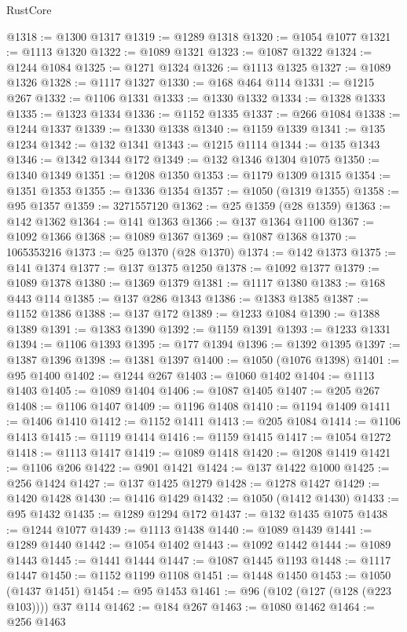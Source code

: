 \begin{lexlean}{RustCore}
\begin{coremodule}
@1318 := @1300 @1317
@1319 := @1289 @1318
@1320 := @1054 @1077
@1321 := @1113 @1320
@1322 := @1089 @1321
@1323 := @1087 @1322
@1324 := @1244 @1084
@1325 := @1271 @1324
@1326 := @1113 @1325
@1327 := @1089 @1326
@1328 := @1117 @1327
@1330 := @168 @464 @114
@1331 := @1215 @267
@1332 := @1106 @1331
@1333 := @1330 @1332
@1334 := @1328 @1333
@1335 := @1323 @1334
@1336 := @1152 @1335
@1337 := @266 @1084
@1338 := @1244 @1337
@1339 := @1330 @1338
@1340 := @1159 @1339
@1341 := @135 @1234
@1342 := @132 @1341
@1343 := @1215 @1114
@1344 := @135 @1343
@1346 := @1342 @1344 @172
@1349 := @132 @1346 @1304 @1075
@1350 := @1340 @1349
@1351 := @1208 @1350
@1353 := @1179 @1309 @1315
@1354 := @1351 @1353
@1355 := @1336 @1354
@1357 := @1050 (@1319 @1355)
@1358 := @95 @1357
@1359 := 3271557120
@1362 := @25 @1359 (@28 @1359)
@1363 := @142 @1362
@1364 := @141 @1363
@1366 := @137 @1364 @1100
@1367 := @1092 @1366
@1368 := @1089 @1367
@1369 := @1087 @1368
@1370 := 1065353216
@1373 := @25 @1370 (@28 @1370)
@1374 := @142 @1373
@1375 := @141 @1374
@1377 := @137 @1375 @1250
@1378 := @1092 @1377
@1379 := @1089 @1378
@1380 := @1369 @1379
@1381 := @1117 @1380
@1383 := @168 @443 @114
@1385 := @137 @286 @1343
@1386 := @1383 @1385
@1387 := @1152 @1386
@1388 := @137 @172
@1389 := @1233 @1084
@1390 := @1388 @1389
@1391 := @1383 @1390
@1392 := @1159 @1391
@1393 := @1233 @1331
@1394 := @1106 @1393
@1395 := @177 @1394
@1396 := @1392 @1395
@1397 := @1387 @1396
@1398 := @1381 @1397
@1400 := @1050 (@1076 @1398)
@1401 := @95 @1400
@1402 := @1244 @267
@1403 := @1060 @1402
@1404 := @1113 @1403
@1405 := @1089 @1404
@1406 := @1087 @1405
@1407 := @205 @267
@1408 := @1106 @1407
@1409 := @1196 @1408
@1410 := @1194 @1409
@1411 := @1406 @1410
@1412 := @1152 @1411
@1413 := @205 @1084
@1414 := @1106 @1413
@1415 := @1119 @1414
@1416 := @1159 @1415
@1417 := @1054 @1272
@1418 := @1113 @1417
@1419 := @1089 @1418
@1420 := @1208 @1419
@1421 := @1106 @206
@1422 := @901 @1421
@1424 := @137 @1422 @1000
@1425 := @256 @1424
@1427 := @137 @1425 @1279
@1428 := @1278 @1427
@1429 := @1420 @1428
@1430 := @1416 @1429
@1432 := @1050 (@1412 @1430)
@1433 := @95 @1432
@1435 := @1289 @1294 @172
@1437 := @132 @1435 @1075
@1438 := @1244 @1077
@1439 := @1113 @1438
@1440 := @1089 @1439
@1441 := @1289 @1440
@1442 := @1054 @1402
@1443 := @1092 @1442
@1444 := @1089 @1443
@1445 := @1441 @1444
@1447 := @1087 @1445 @1193
@1448 := @1117 @1447
@1450 := @1152 @1199 @1108
@1451 := @1448 @1450
@1453 := @1050 (@1437 @1451)
@1454 := @95 @1453
@1461 := @96 (@102 (@127 (@128 (@223 @103)))) @37 @114
@1462 := @184 @267
@1463 := @1080 @1462
@1464 := @256 @1463

\end{coremodule}
\end{lexlean}
